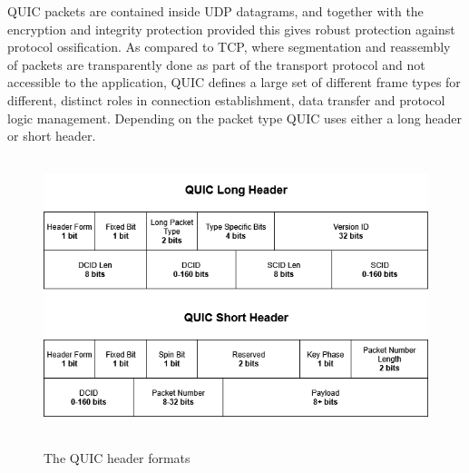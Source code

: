 \documentclass[english, 12pt, a4paper, elec, utf8, a-2b, online]{aaltothesis}
\begin{document}
QUIC packets are contained inside UDP datagrams, and together with the encryption
and integrity protection provided this gives robust protection against protocol
ossification. As compared to TCP, where segmentation and reassembly of packets are
transparently done as part of the transport protocol and not accessible to the
application, QUIC defines a large set of different frame types for different,
distinct roles in connection establishment, data transfer and protocol logic
management. Depending on the packet type QUIC uses either a long header or short
header.
\begin{figure}[b]
	\centering
	\includegraphics[alt={A block diagram of the QUIC short and long header format, detailing its fields and their sizes.}, height=8cm]{./images/quic_header.png}
	\caption{The QUIC header formats}
	\label{fig:quic_header}
\end{figure}
\end{document}
